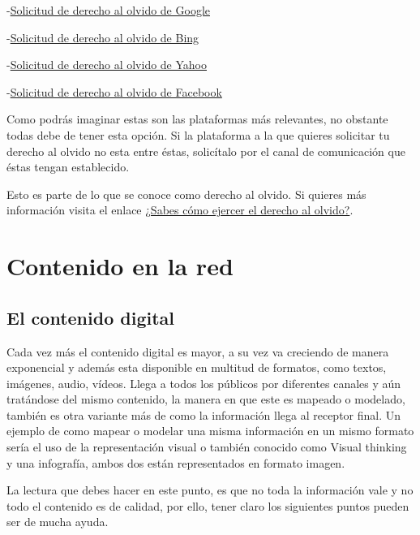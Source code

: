 \documentclass[
  spanish,
  a4paper,
  openany]{book}
\begin{document}
-\href{https://support.google.com/websearch/troubleshooter/3111061?hl=es}{Solicitud de derecho al olvido de Google}

-\href{https://help.bing.microsoft.com/\#apex/18/ES/10013/-1/ES}{Solicitud de derecho al olvido de Bing}

-\href{https://es-us.ayuda.yahoo.com/kb/Eliminaci\%C3\%B3n-de-resultados-de-b\%C3\%BAsqueda-de-Yahoo-Search-sln4530.html}{Solicitud de derecho al olvido de Yahoo}

-\href{https://www.facebook.com/help/217091804975136}{Solicitud de derecho al olvido de Facebook}

Como podrás imaginar estas son las plataformas más relevantes, no obstante todas debe de tener esta opción. Si la plataforma a la que quieres solicitar tu derecho al olvido no esta entre éstas, solicítalo por el canal de comunicación que éstas tengan establecido.

Esto es parte de lo que se conoce como derecho al olvido. Si quieres más información visita el enlace \href{https://www.osi.es/es/actualidad/blog/2018/09/19/sabes-como-ejercer-el-derecho-al-olvido}{¿Sabes cómo ejercer el derecho al olvido?}.

\hypertarget{contenido-en-la-red}{%
\chapter{Contenido en la red}\label{contenido-en-la-red}}

\hypertarget{el-contenido-digital}{%
\section{El contenido digital}\label{el-contenido-digital}}

Cada vez más el contenido digital es mayor, a su vez va creciendo de manera exponencial y además esta disponible en multitud de formatos, como textos, imágenes, audio, vídeos. Llega a todos los públicos por diferentes canales y aún tratándose del mismo contenido, la manera en que este es mapeado o modelado, también es otra variante más de como la información llega al receptor final. Un ejemplo de como mapear o modelar una misma información en un mismo formato sería el uso de la representación visual o también conocido como Visual thinking y una infografía, ambos dos están representados en formato imagen.

La lectura que debes hacer en este punto, es que no toda la información vale y no todo el contenido es de calidad, por ello, tener claro los siguientes puntos pueden ser de mucha ayuda.
\end{document}
